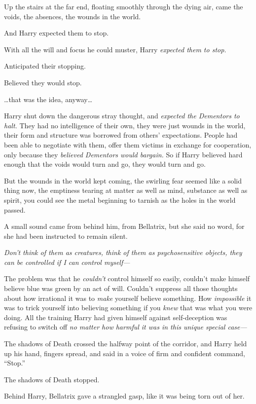 Up the stairs at the far end, floating smoothly through the dying air,
came the voids, the absences, the wounds in the world.

And Harry expected them to stop.

With all the will and focus he could muster, Harry \emph{expected them
to stop.}

Anticipated their stopping.

Believed they would stop.

\ldots{}that was the idea, anyway\ldots{}

Harry shut down the dangerous stray thought, and \emph{expected the
Dementors to halt.} They had no intelligence of their own, they were
just wounds in the world, their form and structure was borrowed from
others' expectations. People had been able to negotiate with them, offer
them victims in exchange for cooperation, only because they
\emph{believed Dementors would bargain.} So if Harry believed hard
enough that the voids would turn and go, they would turn and go.

But the wounds in the world kept coming, the swirling fear seemed like a
solid thing now, the emptiness tearing at matter as well as mind,
substance as well as spirit, you could see the metal beginning to
tarnish as the holes in the world passed.

A small sound came from behind him, from Bellatrix, but she said no
word, for she had been instructed to remain silent.

\emph{Don't think of them as creatures, think of them as psychosensitive
objects, they can be controlled if I can control myself---}

The problem was that he \emph{couldn't} control himself so easily,
couldn't make himself believe blue was green by an act of will. Couldn't
suppress all those thoughts about how irrational it was to \emph{make}
yourself believe something. How \emph{impossible} it was to trick
yourself into believing something if you \emph{knew} that was what you
were doing. All the training Harry had given himself against
self-deception was refusing to switch off \emph{no matter how harmful it
was in this unique special case---}

The shadows of Death crossed the halfway point of the corridor, and
Harry held up his hand, fingers spread, and said in a voice of firm and
confident command, ``Stop.''

The shadows of Death stopped.

Behind Harry, Bellatrix gave a strangled gasp, like it was being torn
out of her.

